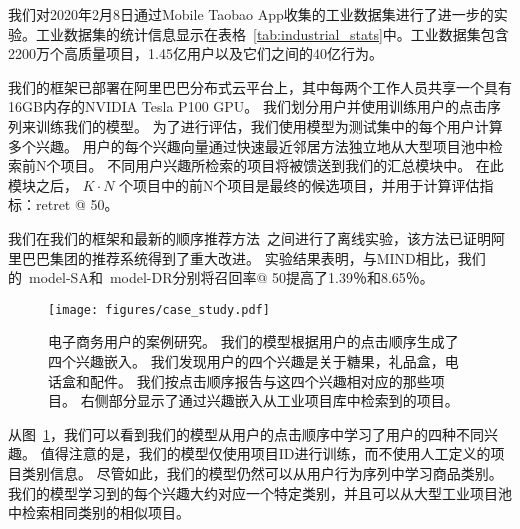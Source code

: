 我们对2020年2月8日通过Mobile Taobao App收集的工业数据集进行了进一步的实验。工业数据集的统计信息显示在表格~\ref{tab:industrial_stats}中。工业数据集包含2200万个高质量项目，1.45亿用户以及它们之间的40亿行为。%

我们的框架已部署在阿里巴巴分布式云平台上，其中每两个工作人员共享一个具有16GB内存的NVIDIA Tesla P100 GPU。 我们划分用户并使用训练用户的点击序列来训练我们的模型。 为了进行评估，我们使用模型为测试集中的每个用户计算多个兴趣。 用户的每个兴趣向量通过快速最近邻居方法独立地从大型项目池中检索前N个项目。 不同用户兴趣所检索的项目将被馈送到我们的汇总模块中。 在此模块之后， $K\cdot N$ 个项目中的前N个项目是最终的候选项目，并用于计算评估指标：retret @ 50。

我们在我们的框架和最新的顺序推荐方法~\cite{li2019multi}之间进行了离线实验，该方法已证明阿里巴巴集团的推荐系统得到了重大改进。 实验结果表明，与MIND相比，我们的\ model-SA和\ model-DR分别将召回率@ 50提高了1.39％和8.65％。

\begin{figure}
    \centering
    \texttt{[image: figures/case\_study.pdf]}
    \caption{电子商务用户的案例研究。 我们的模型根据用户的点击顺序生成了四个兴趣嵌入。 我们发现用户的四个兴趣是关于糖果，礼品盒，电话盒和配件。 我们按点击顺序报告与这四个兴趣相对应的那些项目。 右侧部分显示了通过兴趣嵌入从工业项目库中检索到的项目。}
    \label{fig:case_study_interests}
\end{figure}


从图~\ref{fig:case_study_interests}，我们可以看到我们的模型从用户的点击顺序中学习了用户的四种不同兴趣。 值得注意的是，我们的模型仅使用项目ID进行训练，而不使用人工定义的项目类别信息。 尽管如此，我们的模型仍然可以从用户行为序列中学习商品类别。 我们的模型学习到的每个兴趣大约对应一个特定类别，并且可以从大型工业项目池中检索相同类别的相似项目。


